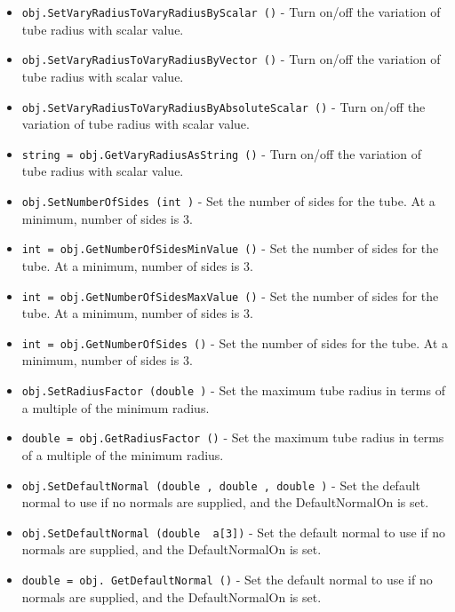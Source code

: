 \begin{itemize}
\item  \verb|obj.SetVaryRadiusToVaryRadiusByScalar ()| -  Turn on/off the variation of tube radius with scalar value.

\item  \verb|obj.SetVaryRadiusToVaryRadiusByVector ()| -  Turn on/off the variation of tube radius with scalar value.

\item  \verb|obj.SetVaryRadiusToVaryRadiusByAbsoluteScalar ()| -  Turn on/off the variation of tube radius with scalar value.

\item  \verb|string = obj.GetVaryRadiusAsString ()| -  Turn on/off the variation of tube radius with scalar value.

\item  \verb|obj.SetNumberOfSides (int )| -  Set the number of sides for the tube. At a minimum, number of sides is 3.

\item  \verb|int = obj.GetNumberOfSidesMinValue ()| -  Set the number of sides for the tube. At a minimum, number of sides is 3.

\item  \verb|int = obj.GetNumberOfSidesMaxValue ()| -  Set the number of sides for the tube. At a minimum, number of sides is 3.

\item  \verb|int = obj.GetNumberOfSides ()| -  Set the number of sides for the tube. At a minimum, number of sides is 3.

\item  \verb|obj.SetRadiusFactor (double )| -  Set the maximum tube radius in terms of a multiple of the minimum radius.

\item  \verb|double = obj.GetRadiusFactor ()| -  Set the maximum tube radius in terms of a multiple of the minimum radius.

\item  \verb|obj.SetDefaultNormal (double , double , double )| -  Set the default normal to use if no normals are supplied, and the
 DefaultNormalOn is set.

\item  \verb|obj.SetDefaultNormal (double  a[3])| -  Set the default normal to use if no normals are supplied, and the
 DefaultNormalOn is set.

\item  \verb|double = obj. GetDefaultNormal ()| -  Set the default normal to use if no normals are supplied, and the
 DefaultNormalOn is set.


\end{itemize}
